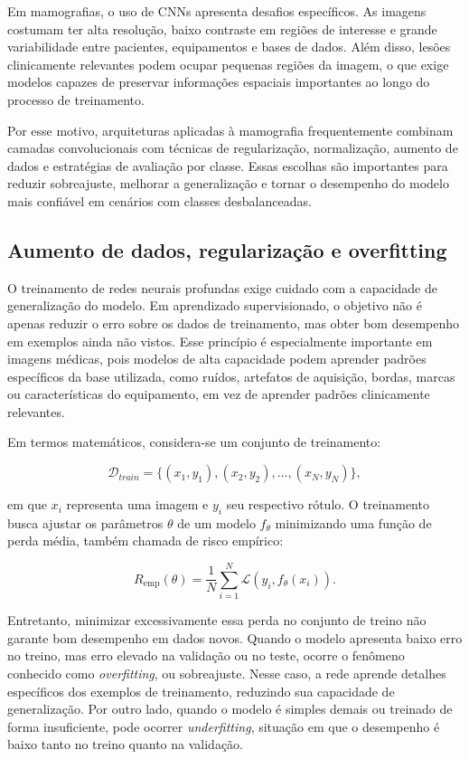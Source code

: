 \documentclass[
    12pt,
    openright,
    oneside,
    a4paper,
    english,
    brazil
]{abntex2}
\begin{document}
Em mamografias, o uso de CNNs apresenta desafios específicos. As imagens costumam ter alta resolução, baixo contraste em regiões de interesse e grande variabilidade entre pacientes, equipamentos e bases de dados. Além disso, lesões clinicamente relevantes podem ocupar pequenas regiões da imagem, o que exige modelos capazes de preservar informações espaciais importantes ao longo do processo de treinamento.

Por esse motivo, arquiteturas aplicadas à mamografia frequentemente combinam camadas convolucionais com técnicas de regularização, normalização, aumento de dados e estratégias de avaliação por classe. Essas escolhas são importantes para reduzir sobreajuste, melhorar a generalização e tornar o desempenho do modelo mais confiável em cenários com classes desbalanceadas.

\subsection{Aumento de dados, regularização e overfitting}
\label{subsec:aumento_regularizacao_overfitting}

O treinamento de redes neurais profundas exige cuidado com a capacidade de generalização do modelo. Em aprendizado supervisionado, o objetivo não é apenas reduzir o erro sobre os dados de treinamento, mas obter bom desempenho em exemplos ainda não vistos. Esse princípio é especialmente importante em imagens médicas, pois modelos de alta capacidade podem aprender padrões específicos da base utilizada, como ruídos, artefatos de aquisição, bordas, marcas ou características do equipamento, em vez de aprender padrões clinicamente relevantes.

Em termos matemáticos, considera-se um conjunto de treinamento:

\[
\mathcal{D}_{train} = \{(x_1,y_1),(x_2,y_2),\ldots,(x_N,y_N)\},
\]

em que \(x_i\) representa uma imagem e \(y_i\) seu respectivo rótulo. O treinamento busca ajustar os parâmetros \(\theta\) de um modelo \(f_{\theta}\) minimizando uma função de perda média, também chamada de risco empírico:

\[
R_{\text{emp}}(\theta) =
\frac{1}{N}
\sum_{i=1}^{N}
\mathcal{L}(y_i, f_{\theta}(x_i)).
\]

Entretanto, minimizar excessivamente essa perda no conjunto de treino não garante bom desempenho em dados novos. Quando o modelo apresenta baixo erro no treino, mas erro elevado na validação ou no teste, ocorre o fenômeno conhecido como \textit{overfitting}, ou sobreajuste. Nesse caso, a rede aprende detalhes específicos dos exemplos de treinamento, reduzindo sua capacidade de generalização. Por outro lado, quando o modelo é simples demais ou treinado de forma insuficiente, pode ocorrer \textit{underfitting}, situação em que o desempenho é baixo tanto no treino quanto na validação.
\end{document}
